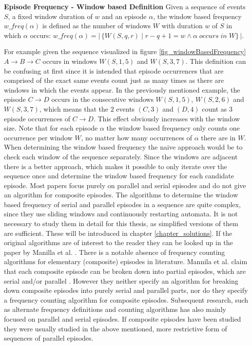 \begin{mydef}
\label{def_windowBasedFrequency}
\textbf{Episode Frequency - Window based Definition} Given a sequence of events $S$, a fixed window duration of $w$ and an episode $\alpha$, the window based frequency $w\_freq(\alpha )$ is defined as the number of windows $W$ with duration $w$ of $S$ in which $\alpha$ occurs: $w\_freq(\alpha ) = |\,\{W(S,q,r) \mid r-q+1 = w \land \alpha \;occurs\; in\; W \}\,|$.
\end{mydef}


For example given the sequence visualized in figure \ref{fig_windowBasedFrequency} $A \rightarrow B \rightarrow C$ occurs in windows $W(S,1,5)$ and $W(S,3,7)$. \newline 
This definition can be confusing at first since it is intended that episode occurrences that are comprised of the exact same events count just as many times as there are windows in which the events appear. In the previously mentioned example, the episode $C \rightarrow D$ occurs in the consecutive windows $W(S,1,5)$, $W(S,2,6)$ and $W(S,3,7)$, which means that the $2$ events $(C,3)$ and $(D,4)$ count as $3$ episode occurrences of $C \rightarrow D$. This effect obviously increases with the window size. Note that for each episode $\alpha$ the window based frequency only counts one occurrence per window $W$, no matter how many occurrences of $\alpha$ there are in $W$.\newline
When determining the window based frequency the naive approach would be to check each window of the sequence separately. Since the windows are adjacent there is a better approach, which makes it possible to only iterate over the sequence once and determine the window based frequency for each candidate episode. Most papers focus purely on parallel and serial episodes and do not give an algorithm for composite episodes. The algorithms to determine the window based frequency of serial and parallel episodes in a sequence are quite complex, since they use sliding windows and continuously restarting automata. It is not necessary to study them in detail for this thesis, as simplified versions of them are sufficient. These will be introduced in chapter \ref{chapter_solutions}. If the original algorithms are of interest to the reader they can be looked up in the paper by Manilla et al. \cite{mannila1997discovery}.
There is a notable absence of frequency counting algorithms for elementary (composite) episodes in literature. Mannila et al. claim that each composite episode can be broken down into partial episodes, which are serial and/or parallel \cite{mannila1997discovery}. However they neither specify an algorithm for breaking down composite episodes into purely serial and parallel parts, nor do they specify a frequency counting algorithm for composite episodes. Subsequent research, such as alternate frequency definitions and counting algorithms has also mainly focused on parallel and serial episodes. If composite episodes have been studied they were usually studied in the above mentioned, more restrictive form of sequences of parallel episodes. \newline

